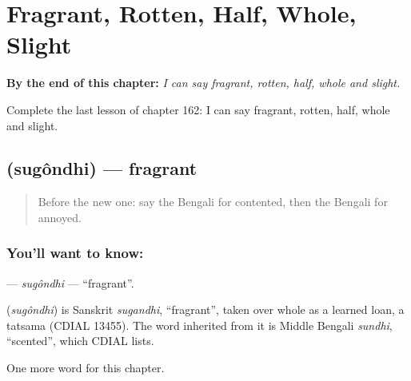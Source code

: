 
\chapter{Fragrant, Rotten, Half, Whole, Slight}
\label{ch:bn-fragrant-rotten-half-whole-slight}

\begin{chapteropening}
\textbf{By the end of this chapter:} \emph{I can say fragrant, rotten, half, whole and slight.}

Complete the last lesson of chapter 162: I can say fragrant, rotten, half, whole and slight.
\end{chapteropening}

\section[\texorpdfstring{\bn{সুগন্ধি} (sugôndhi)}{সুগন্ধি (sugôndhi)}]{ (sugôndhi) — fragrant}

\label{lesson:BN-C162-sugondhi}



\begin{quote}
Before the new one: say the Bengali for contented, then the Bengali for annoyed.
\end{quote}

\subsection*{You'll want to know: }
\textbf{} — \emph{sugôndhi} — \textquotedblleft{}fragrant\textquotedblright{}.

\begin{cousinweb}
\textbf{} (\emph{sugôndhi}) is Sanskrit \emph{sugandhi}, \textquotedblleft{}fragrant\textquotedblright{}, taken over whole as a learned loan, a tatsama (CDIAL 13455). The word inherited from it is Middle Bengali \emph{sundhi}, \textquotedblleft{}scented\textquotedblright{}, which CDIAL lists.
\end{cousinweb}

\begin{grammarlens}[title={What you've built}]
One more word for this chapter.
\end{grammarlens}


